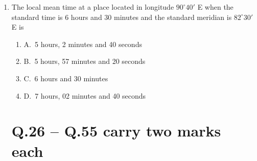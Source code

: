 \documentclass[journal,12pt,onecolumn]{IEEEtran}
\theoremstyle{remark}
\begin{document}
\begin{enumerate}
\noindent\item The local mean time at a place located in longitude $90^\circ40'$ E when the standard time is 6 hours and 30 minutes and the standard meridian is $82^\circ30'$ E is
\hfill{}
\begin{enumerate}[label=]
\item A.\ 5 hours, 2 minutes and 40 seconds \\
\item B.\ 5 hours, 57 minutes and 20 seconds \\
\item C.\ 6 hours and 30 minutes \\
\item D.\ 7 hours, 02 minutes and 40 seconds
\end{enumerate}

\raggedright
    
\section*{Q.26 -- Q.55 carry two marks each}


\end{enumerate}
\end{document}

